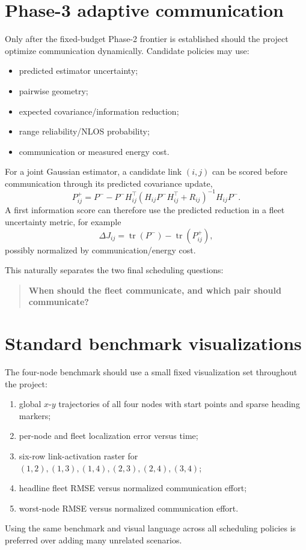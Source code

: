 \section{Phase-3 adaptive communication}
Only after the fixed-budget Phase-2 frontier is established should the project optimize communication dynamically. Candidate policies may use:
\begin{itemize}
    \item predicted estimator uncertainty;
    \item pairwise geometry;
    \item expected covariance/information reduction;
    \item range reliability/NLOS probability;
    \item communication or measured energy cost.
\end{itemize}

For a joint Gaussian estimator, a candidate link \((i,j)\) can be scored before communication through its predicted covariance update,
\begin{equation}
    P^+_{ij}
    =
    P^-
    -
    P^-H_{ij}^{\top}
    \left(H_{ij}P^-H_{ij}^{\top}+R_{ij}\right)^{-1}
    H_{ij}P^-.
\end{equation}
A first information score can therefore use the predicted reduction in a fleet uncertainty metric, for example
\begin{equation}
    \Delta J_{ij}
    =
    \operatorname{tr}(P^-)-\operatorname{tr}(P^+_{ij}),
\end{equation}
possibly normalized by communication/energy cost.

This naturally separates the two final scheduling questions:
\begin{quote}
\textbf{When should the fleet communicate, and which pair should communicate?}
\end{quote}

\section{Standard benchmark visualizations}
The four-node benchmark should use a small fixed visualization set throughout the project:
\begin{enumerate}
    \item global \(x\)-\(y\) trajectories of all four nodes with start points and sparse heading markers;
    \item per-node and fleet localization error versus time;
    \item six-row link-activation raster for \((1,2),(1,3),(1,4),(2,3),(2,4),(3,4)\);
    \item headline fleet RMSE versus normalized communication effort;
    \item worst-node RMSE versus normalized communication effort.
\end{enumerate}
Using the same benchmark and visual language across all scheduling policies is preferred over adding many unrelated scenarios.

